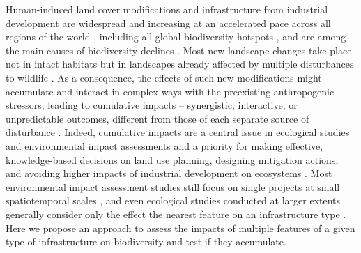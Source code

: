 \documentclass[titlepage]{article}
\begin{document}
Human-induced land cover modifications and infrastructure from industrial development are widespread and increasing at an accelerated pace across all regions of the world \citep{venter_sixteen_2016,ibisch_global_2016}, including all global biodiversity hotspots \citep{sloan_remaining_2014}, and are among the main causes of biodiversity declines \citep{benitez-lopez_impacts_2010,newbold_global_2015}. Most new landscape changes take place not in intact habitats but in landscapes already affected by multiple disturbances to wildlife \citep{barber_roads_2014,kowe_quantitative_2020}. As a consequence, the effects of such new modifications might accumulate and interact in complex ways with the preexisting anthropogenic stressors, leading to cumulative impacts \citep[Box 1; ][]{gillingham_integration_2016} -- synergistic, interactive, or unpredictable outcomes, different from those of each separate source of disturbance \citep{naugle_unifying_2011}. 
Indeed, cumulative impacts are a central issue in ecological studies and environmental impact assessments and a priority for making effective, knowledge-based decisions on land use planning, designing mitigation actions, and avoiding higher impacts of industrial development on ecosystems \citep{krausman_cumulative_2011, laurance_roads_2017}. Most environmental impact assessment studies still focus on single projects at small spatiotemporal scales \citep{johnson_regulating_2011}, and even ecological studies conducted at larger extents generally consider only the effect the nearest feature on an infrastructure type \citep[e.g.][]{torres_assessing_2016}. Here we propose an approach to assess the impacts of multiple features of a given type of infrastructure on biodiversity and test if they accumulate. 

\end{document}
